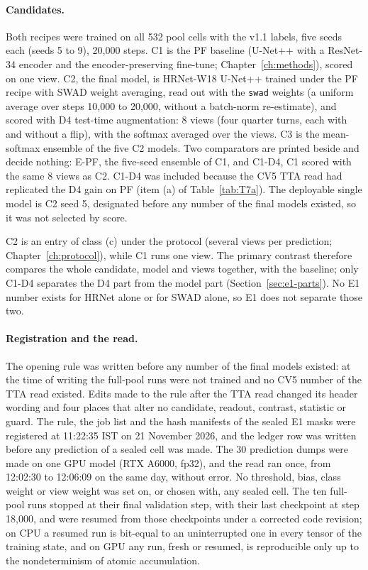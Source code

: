\paragraph{Candidates.} Both recipes were trained on all 532 pool cells with the v1.1 labels, five seeds each (seeds 5 to 9),
20,000 steps. C1 is the PF baseline (U-Net++ with a ResNet-34 encoder and the encoder-preserving fine-tune;
Chapter~\ref{ch:methods}), scored on one view. C2, the final model, is HRNet-W18 U-Net++ trained under the PF recipe with SWAD
weight averaging, read out with the \texttt{swad} weights (a uniform average over steps 10,000 to 20,000, without a batch-norm
re-estimate), and scored with D4 test-time augmentation: 8 views (four quarter turns, each with and without a flip), with
the softmax averaged over the views. C3 is the mean-softmax ensemble of the five C2 models. Two comparators are printed beside
and decide nothing: E-PF, the five-seed ensemble of C1, and C1-D4, C1 scored with the same 8 views as C2. C1-D4 was included
because the CV5 TTA read had replicated the D4 gain on PF (item (a) of Table~\ref{tab:T7a}). The deployable single model is C2
seed 5, designated before any number of the final models existed, so it was not selected by score.

C2 is an entry of class (c) under the protocol (several views per prediction; Chapter~\ref{ch:protocol}), while C1 runs one
view. The primary contrast therefore compares the whole candidate, model and views together, with the baseline; only C1-D4
separates the D4 part from the model part (Section~\ref{sec:e1-parts}). No E1 number exists for HRNet alone or for SWAD alone,
so E1 does not separate those two.

\paragraph{Registration and the read.} The opening rule was written before any number of the final models existed: at the
time of writing the full-pool runs were not trained and no CV5 number of the TTA read existed. Edits made to the rule after the
TTA read changed its header wording and four places that alter no candidate, readout, contrast, statistic or guard. The rule, the job list and the
hash manifests of the sealed E1 masks were registered at 11:22:35 IST on 21 November 2026, and the ledger row was written
before any prediction of a sealed cell was made. The 30 prediction dumps were made on one GPU model (RTX A6000, fp32), and the
read ran once, from 12:02:30 to 12:06:09 on the same day, without error. No threshold, bias, class weight or view weight
was set on, or chosen with, any sealed cell. The ten full-pool runs stopped at their final validation step, with their last checkpoint at step
18,000, and were resumed from those checkpoints under a corrected code revision; on CPU a resumed run is bit-equal to an
uninterrupted one in every tensor of the training state, and on GPU any run, fresh or resumed, is reproducible only up to
the nondeterminism of atomic accumulation.

